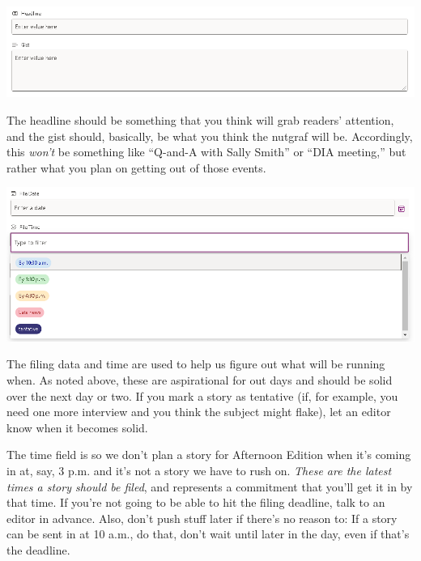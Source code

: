 \documentclass[
  11pt,
  american,
  letterpaperpaper,
  extrafontsizes,onecolumn,openright
  ]{memoir}
\begin{document}
\scriptsize

\begin{center}\includegraphics[width=0.8\linewidth]{images/headline-gist-new} \end{center}

\normalsize

The headline should be something that you think will grab readers' attention, and the gist should, basically, be what you think the nutgraf will be. Accordingly, this \emph{won't} be something like \enquote{Q-and-A with Sally Smith} or \enquote{DIA meeting,} but rather what you plan on getting out of those events.

\scriptsize

\begin{center}\includegraphics[width=0.8\linewidth]{images/file-date-time-new} \end{center}

\normalsize

The filing data and time are used to help us figure out what will be running when. As noted above, these are aspirational for out days and should be solid over the next day or two. If you mark a story as tentative (if, for example, you need one more interview and you think the subject might flake), let an editor know when it becomes solid.

The time field is so we don't plan a story for Afternoon Edition when it's coming in at, say, 3 p.m. and it's not a story we have to rush on. \emph{These are the latest times a story should be filed}, and represents a commitment that you'll get it in by that time. If you're not going to be able to hit the filing deadline, talk to an editor in advance. Also, don't push stuff later if there's no reason to: If a story can be sent in at 10 a.m., do that, don't wait until later in the day, even if that's the deadline.
\end{document}
